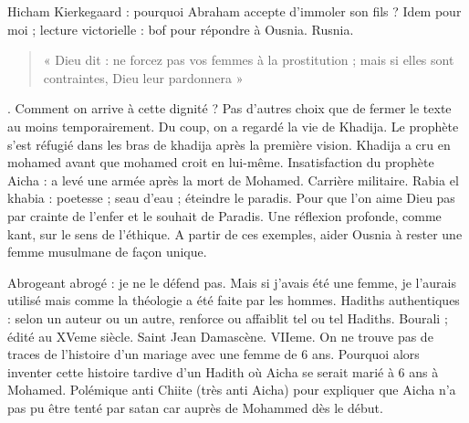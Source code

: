 Hicham
Kierkegaard : pourquoi Abraham accepte d’immoler son fils ?
Idem pour moi ; lecture victorielle : bof pour répondre à Ousnia. Rusnia.
\begin{quote}
    « Dieu dit : ne forcez pas vos femmes à la prostitution ; mais si elles sont contraintes, Dieu leur pardonnera »
\end{quote}
. Comment on arrive à cette dignité ?
Pas d’autres choix que de fermer le texte au moins temporairement.
Du coup, on a regardé la vie de Khadija. Le prophète s’est réfugié dans les bras de khadija après la première vision. Khadija a cru en mohamed avant que mohamed croit en lui-même. Insatisfaction du prophète 
Aicha : a levé une armée après la mort de Mohamed. Carrière militaire.
Rabia el khabia : poetesse ; seau d’eau ; éteindre le paradis. Pour que l’on aime Dieu pas par crainte de l’enfer et le souhait de Paradis. Une réflexion profonde, comme kant, sur le sens de l’éthique.
A partir de ces exemples, aider Ousnia à rester une femme musulmane de façon unique. 


Abrogeant abrogé : je ne le défend pas. Mais si j’avais été une femme, je l’aurais utilisé mais comme la théologie a été faite par les hommes.
Hadiths authentiques : selon un auteur ou un autre, renforce ou affaiblit tel ou tel Hadiths. Bourali ; édité au XVeme siècle. 
Saint Jean Damascène. VIIeme. On ne trouve pas de traces de l’histoire d’un mariage avec une femme de 6 ans. Pourquoi alors inventer cette histoire tardive d’un Hadith où Aicha se serait marié à 6 ans à Mohamed. Polémique anti Chiite (très anti Aicha) pour expliquer que Aicha n’a pas pu être tenté par satan car auprès de Mohammed dès le début.


